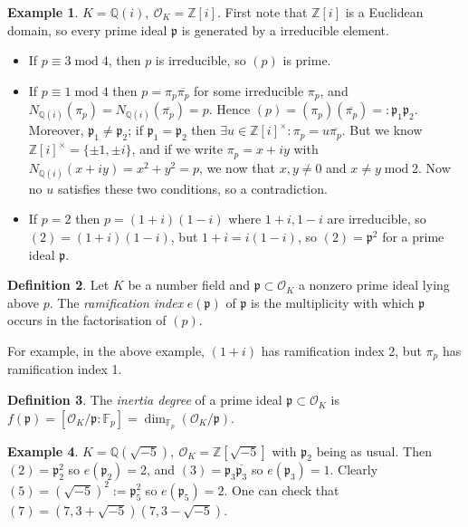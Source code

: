 \documentclass{article}
\newcommand{\Z}{\mathbb{Z}}
\newcommand{\Q}{\mathbb{Q}}
\newcommand{\F}{\mathbb{F}}
\newcommand{\Mod}{\operatorname{mod}}
\newcommand{\ri}{\mathcal{O}}
\newcommand{\ip}{\mathfrak{p}}
\theoremstyle{definition}
\newtheorem{defn}{Definition}[subsection]
\newtheorem{example}[defn]{Example}
\begin{document}
\begin{example}
$K=\Q(i),\ \ri_K=\Z[i]$. First note that $\Z[i]$ is a Euclidean domain, so every prime ideal $\ip$ is generated by a irreducible element.
\begin{itemize}
\item If $p\equiv 3\Mod 4$, then $p$ is irreducible, so $(p)$ is prime.
\item If $p\equiv 1\Mod 4$ then $p=\pi_p\overline{\pi_p}$ for some irreducible $\pi_p$, and $N_{\Q(i)}(\pi_p)=N_{\Q(i)}\left(\overline{\pi_p}\right)=p.$ Hence $(p)=(\pi_p)\left(\overline{\pi_p}\right)=:\ip_1\ip_2$. Moreover, $\ip_1\neq\ip_2$; if $\ip_1=\ip_2$ then $\exists u\in\Z[i]^\times:\pi_p=u\overline{\pi_p}$. But we know $\Z[i]^\times=\{\pm 1,\pm i\}$, and if we write $\pi_p=x+iy$ with $N_{\Q(i)}(x+iy)=x^2+y^2=p$, we now that $x,y\neq 0$ and $x\neq y\Mod 2$. Now no $u$ satisfies these two conditions, so a contradiction.
\item If $p=2$ then $p=(1+i)(1-i)$ where $1+i,1-i$ are irreducible, so $(2)=(1+i)(1-i)$, but $1+i=i(1-i)$, so $(2)=\ip^2$ for a prime ideal $\ip$.
\end{itemize}
\end{example}

\begin{defn}
Let $K$ be a number field and $\ip\subset\ri_K$ a nonzero prime ideal lying above $p$. The \textit{ramification index} $e(\ip)$ of $\ip$ is the multiplicity with which $\ip$ occurs in the factorisation of $(p)$.
\end{defn}
For example, in the above example, $(1+i)$ has ramification index 2, but $\pi_p$ has ramification index 1.

\begin{defn}
The \textit{inertia degree} of a prime ideal $\ip\subset\ri_K$ is $f(\ip)=\left[\ri_K/\ip:\F_p\right]=\dim_{\F_p}\left(\ri_K/\ip\right)$. 
\end{defn}

\begin{example}
$K=\Q\left(\sqrt{-5}\right),\ \ri_K=\Z\left[\sqrt{-5}\right]$ with $\ip_2$ being as usual. Then $(2)=\ip_2^2$ so $e(\ip_2)=2$, and $(3)=\ip_3\overline{\ip_3}$ so $e(\ip_3)=1$. Clearly $(5)=\left(\sqrt{-5}\right)^2:=\ip_5^2$ so $e(\ip_5)=2$. One can check that $(7)=\left(7,3+\sqrt{-5}\right)\left(7,3-\sqrt{-5}\right)$.
\end{example}
\end{document}
